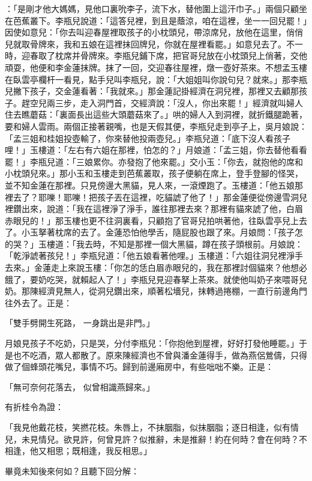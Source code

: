 \begin{showcontents}{}
：「是剛才他大媽媽，見他口裏吮李子，流下水，替他圍上這汗巾子。」兩個只顧坐在芭蕉叢下。李瓶兒說道：「這答兒裡，到且是蔭涼，咱在這裡，坐一一回兒罷！」因使如意兒：「你去叫迎春屋裡取孩子的小枕頭兒，帶涼席兒，放他在這里，俏俏兒就取骨牌來，我和五娘在這裡抹回牌兒，你就在屋裡看罷。」如意兒去了。不一時，迎春取了枕席并骨牌來。李瓶兒鋪下席，把官哥兒放在小枕頭兒上俏著，交他頑耍，他便和李金蓮抹牌。抹了一回，交迎春往屋裡，燉一壺好茶來。不想孟玉樓在臥雲亭欄杆一看見，點手兒叫李瓶兒，說：「大姐姐叫你說句兒？就來。」那李瓶兒撇下孩子，交金蓮看著：「我就來。」那金蓮記掛經濟在洞兒裡，那裡又去顧那孩子。趕空兒兩三步，走入洞門首，交經濟說：「沒人，你出來罷！」經濟就叫婦人住去瞧蘑菇：「裏面長出這些大頭蘑菇來了。」哄的婦人入到洞裡，就折鐵腿跪著，要和婦人雲雨。兩個正接著親嘴，也是天假其便，李瓶兒走到亭子上，吳月娘說：「孟三姐和桂姐投壺輸了，你來替他投兩壺兒。」李瓶兒道：「底下沒人看孩子哩！」玉樓道：「左右有六姐在那裡，怕怎的？」月娘道：「孟三姐，你去替他看看罷！」李瓶兒道：「三娘累你。亦發抱了他來罷。」交小玉：「你去，就抱他的席和小枕頭兒來。」那小玉和玉樓走到芭蕉叢取，孩子便躺在席上，登手登腳的怪哭，並不知金蓮在那裡。只見傍邊大黑貓，見人來，一滾煙跑了。玉樓道：「他五娘那裡去了？耶嚛！耶嚛！把孩子丟在這裡，吃貓諕了他了！」那金蓮便從傍邊雪洞兒裡鑽出來，說道：「我在這裡淨了淨手，誰往那裡去來？那裡有貓來諕了他，白眉赤眼兒的！」那玉樓也更不往洞裏看，只顧抱了官哥兒拍哄著他，往臥雲亭兒上去了。小玉拏著枕席的去了。金蓮恐怕他學舌，隨屁股也跟了來。月娘問：「孩子怎的哭？」玉樓道：「我去時，不知是那裡一個大黑貓，蹲在孩子頭根前。月娘說：「乾淨諕著孩兒！」李瓶兒道：「他五娘看著他哩。」玉樓道：「六姐往洞兒裡淨手去來。」金蓮走上來說玉樓：「你怎的恁白眉赤眼兒的，我在那裡討個貓來？他想必餓了，要奶吃哭，就賴起人了！」李瓶兒見迎春拏上茶來。就使他叫奶子來喂哥兒奶。那陳經濟見無人，從洞兒鑽出來，順著松墻兒，抹轉過捲棚，一直行前邊角門往外去了。正是：

「雙手劈開生死路，  一身跳出是非門。」

月娘見孩子不吃奶，只是哭，分付李瓶兒：「你抱他到屋裡，好好打發他睡罷。」于是也不吃酒，眾人都散了。原來陳經濟也不曾與潘金蓮得手，做為燕侶鶯儔，只得做了個蜂頭花嘴兒，事情不巧。歸到前邊廂房中，有些咄咄不樂。正是：

「無可奈何花落去，  似曾相識燕歸來。」

有折桂令為證：

「我見他戴花枝，笑撚花枝。朱唇上，不抹胭脂，似抹胭脂；逐日相逢，似有情兒，未見情兒。欲見許，何曾見許？似推辭，未是推辭！約在何時？會在何時？不相逢，他又相思；既相逢，我反相思。」

畢竟未知後來何如？且聽下回分解：




\end{showcontents}


